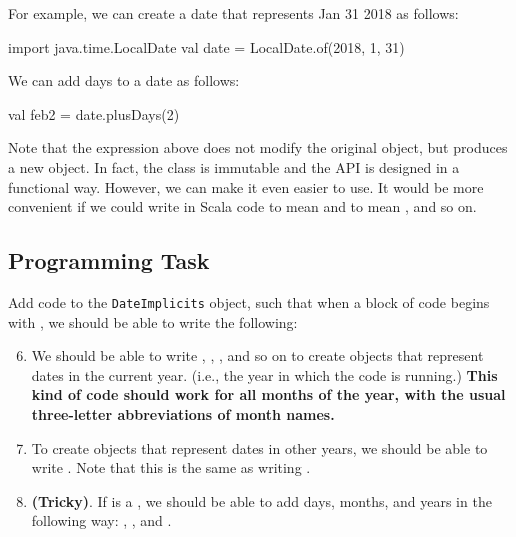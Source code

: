 \documentclass[9pt]{extbook}
\begin{document}
For example, we can create a date that represents Jan 31 2018 as follows:
\begin{scalacode}
import java.time.LocalDate
val date = LocalDate.of(2018, 1, 31)
\end{scalacode}

We can add days to a date as follows:
\begin{scalacode}
val feb2 = date.plusDays(2)
\end{scalacode}

Note that the expression above does not modify the original 
object, but produces a new object. In fact, the  class
is immutable and the API is designed in a functional way. However, we can make
it even easier to use. It would be more convenient if we could write
 in Scala code to mean  
and  to mean , and so on.

\subsection{Programming Task}

Add code to the \lstinline|DateImplicits| object, such that when
a block of code begins with , 
we should be able to write the following:

\begin{enumerate}

  \setcounter{enumi}{5}

  \item We should be able to write , , , and so on to create  objects that represent dates in the current year. (i.e., the year in which the code is running.) \textbf{This kind of code should work for all months of the year, with the usual three-letter abbreviations of month names.}

  \item To create  objects that represent dates in other years, we should be able to write . Note that this is the same as writing .

  \item \textbf{(Tricky)}. If  is a  , we should be able to add days, months, and years in the following way: , , and .

\end{enumerate}
\end{document}
